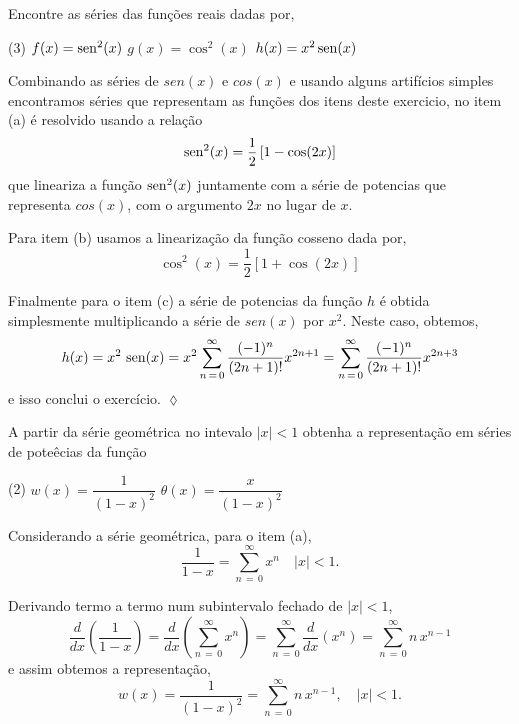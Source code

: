  \begin{exer}
Encontre as séries das funções reais dadas por,
\begin{tasks}[label=(\alph*),item-indent=3em,label-width=4ex,ref=(\alph*)](3)
  \task \(f(x)=\operatorname{sen}^{2}(x)\)
  \task \(g(x)=\cos^{2}(x)\)
  \task \(h(x)=x^{2}\operatorname{sen}(x)\)
\end{tasks}
 \end{exer}

 \solo
Combinando as séries de \(sen(x)\) e \(cos(x)\) e usando alguns artifícios simples encontramos séries que
representam as funções dos itens deste exercicio, no item (a) é resolvido usando a relação
\begin{equation*}
  \operatorname{sen}^{2}(x)=\dfrac{1}{2}\left[1-\cos(2x)\right]
\end{equation*}
que lineariza a função \(\operatorname{sen}^2(x)\) juntamente com a série de potencias que representa \(cos(x)\), com o 
argumento \(2x\) no lugar de \(x\). 

Para item (b) usamos a linearização da função cosseno dada por,
\begin{equation*}
\cos^{2}(x)=\dfrac{1}{2}\left[1+\cos(2x)\right]
\end{equation*} 

Finalmente para o item (c) a série de potencias da função \(h\) 
é obtida simplesmente multiplicando a série de \(sen(x)\) por \(x^{2}\). Neste caso, obtemos,
\begin{equation*}
h(x)=x^{2}\,\operatorname{sen}(x)=x^{2}\sum_{n\, =\, 0}^{\infty}\dfrac{(-1)^{n}}{(2n+1)!}x^{2n+1}=
\sum_{n\, =\, 0}^{\infty}\dfrac{(-1)^{n}}{(2n+1)!}x^{2n+3}
\end{equation*}
e isso conclui o exercício. \hfill \(\lozenge\)

\begin{exer}
A partir da série geométrica no intevalo \(|x|<1\) obtenha a representação em séries de poteêcias
da função 
\begin{tasks}[label=(\alph*),item-indent=3em,label-width=4ex,ref=(\alph*)](2)
\task \(w(x)=\dfrac{1}{(1-x)^{2}}\) 
\task \(\theta(x)=\dfrac{x}{(1-x)^{2}}\)   
\end{tasks}
\end{exer}

\solo
Considerando a série geométrica, para o item (a),
\begin{equation*}
  \dfrac{1}{1-x}=\sum_{n\,=\,0}^{\infty}x^{n} \quad |x| < 1.
\end{equation*}

Derivando termo a termo num subintervalo fechado de \(|x|<1\),
\begin{equation*}
\dfrac{d}{dx}\left( \dfrac{1}{1-x}\right)=\dfrac{d}{dx}\left(\sum_{n\,=\,0}^{\infty}x^{n}\right)
=\sum_{n\,=\,0}^{\infty}\dfrac{d}{dx}\left(x^{n}\right)=\sum_{n\,=\,0}^{\infty}n\,x^{n-1}
\end{equation*}
e assim obtemos a representação,
\begin{equation*}
w(x)=\dfrac{1}{(1-x)^{2}}= \sum_{n\,=\,0}^{\infty}n\,x^{n-1}, \quad |x|<1.
\end{equation*} 

